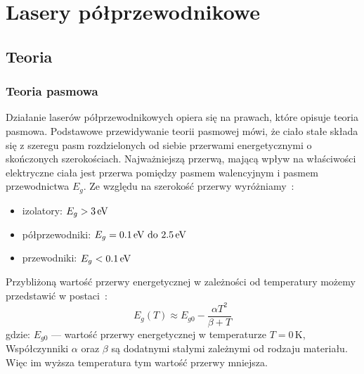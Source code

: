 \chapter{Lasery półprzewodnikowe}
\section{Teoria}
\subsection{Teoria pasmowa}
Działanie laserów półprzewodnikowych opiera się na prawach, które opisuje teoria pasmowa.
Podstawowe przewidywanie teorii pasmowej mówi, że ciało stałe składa się z szeregu pasm rozdzielonych od siebie
przerwami energetycznymi o skończonych szerokościach. Najważniejszą przerwą, mającą wpływ na właściwości elektryczne ciała jest
przerwa pomiędzy pasmem walencyjnym i pasmem przewodnictwa $E_g$. Ze względu na szerokość przerwy
wyróżniamy~\cite{laser_book}:
\begin{itemize}
\item izolatory: $E_g > 3 \text{\,eV}$
\item półprzewodniki: $E_g = 0.1 \text{\,eV do } 2.5\text{\,eV} $
\item przewodniki: $E_g<0.1\text{\,eV}$
\end{itemize}

Przybliżoną wartość przerwy energetycznej w zależności od temperatury możemy przedstawić w postaci~\cite{laser_book}:
\begin{equation}
E_g(T) \approx E_{g0} - \frac{\alpha T^2}{\beta + T}
\end{equation}
gdzie: $E_{g0}$ --- wartość przerwy energetycznej w temperaturze $T=0$\,K,
Współczynniki $\alpha$ oraz $\beta$ są dodatnymi stałymi zależnymi od rodzaju materiału.
Więc im wyższa temperatura tym wartość przerwy mniejsza.
